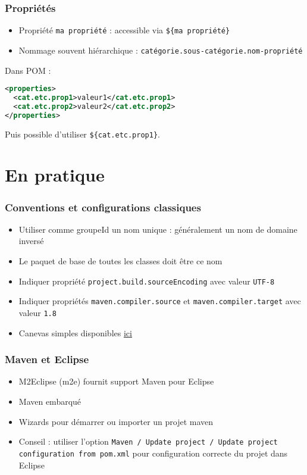 \documentclass[english, french]{beamer}
\begin{document}
\begin{frame}[fragile]
	\frametitle{Propriétés}
	\begin{itemize}
		\item Propriété \texttt{ma propriété} : accessible via \texttt{\$\{ma propriété\}}
		\item Nommage souvent hiérarchique : \texttt{catégorie.sous-catégorie.nom-propriété}
	\end{itemize}
	Dans POM : 
	\begin{lstlisting}[keywordstyle=\fontspec{Latin Modern Mono Light}\textbf, emph={project, modelVersion, groupId, artifactId, version}, emphstyle=\fontspec{Latin Modern Mono Light}\textbf, language=XML, basicstyle=\small\NoAutoSpacing\ttfamily, showstringspaces=false]
<properties>
  <cat.etc.prop1>valeur1</cat.etc.prop1>
  <cat.etc.prop2>valeur2</cat.etc.prop2>
</properties>
\end{lstlisting}
	
	Puis possible d’utiliser \texttt{\$\{cat.etc.prop1\}}.
\end{frame}

\section{En pratique}
\begin{frame}
	\frametitle{Conventions et configurations classiques}
	\begin{itemize}
		\item Utiliser comme groupeId un nom unique : généralement un nom de domaine inversé
		\item Le paquet de base de toutes les classes doit être ce nom
		\item Indiquer propriété \texttt{project.build.sourceEncoding} avec valeur \texttt{UTF-8}
		\item Indiquer propriétés \texttt{maven.compiler.source} et \texttt{maven.compiler.target} avec valeur \texttt{1.8}
		\item Canevas simples disponibles \href{https://github.com/oliviercailloux/samples}{ici}
	\end{itemize}
\end{frame}

\begin{frame}
	\frametitle{Maven et Eclipse}
	\begin{itemize}
		\item M2Eclipse (m2e) fournit support Maven pour Eclipse
		\item Maven embarqué
		\item Wizards pour démarrer ou importer un projet maven
		\item Conseil : utiliser l’option \texttt{Maven / Update project / Update project configuration from pom.xml} pour configuration correcte du projet dans Eclipse
	\end{itemize}
\end{frame}
\end{document}
